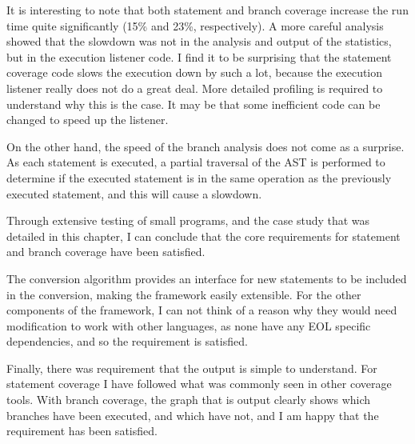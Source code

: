 It is interesting to note that both statement and branch coverage increase the run time quite significantly (15\% and 23\%, respectively). A more careful analysis showed that the slowdown was not in the analysis and output of the statistics, but in the execution listener code. I find it to be surprising that the statement coverage code slows the execution down by such a lot, because the execution listener really does not do a great deal. More detailed profiling is required to understand why this is the case. It may be that some inefficient code can be changed to speed up the listener.

On the other hand, the speed of the branch analysis does not come as a surprise. As each statement is executed, a partial traversal of the AST is performed to determine if the executed statement is in the same operation as the previously executed statement, and this will cause a slowdown.


Through extensive testing of small programs, and the case study that was detailed in this chapter, I can conclude that the core requirements for statement and branch coverage have been satisfied.

The conversion algorithm provides an interface for new statements to be included in the conversion, making the framework easily extensible. For the other components of the framework, I can not think of a reason why they would need modification to work with other languages, as none have any EOL specific dependencies, and so the requirement is satisfied.

Finally, there was requirement that the output is simple to understand. For statement coverage I have followed what was commonly seen in other coverage tools. With branch coverage, the graph that is output clearly shows which branches have been executed, and which have not, and I am happy that the requirement has been satisfied.